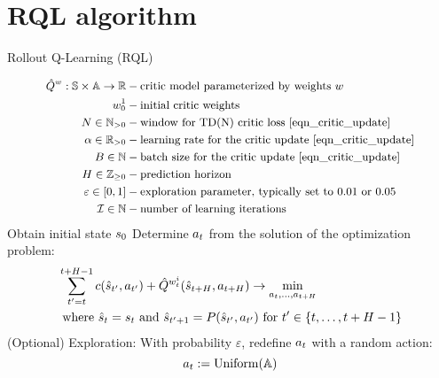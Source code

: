 \documentclass[12pt,twoside]{../../mitthesis}
\begin{document}
\section*{RQL algorithm}
\begin{algorithm}
    \caption{Rollout Q-Learning (RQL)}
    \label{alg:my-alg}
    \begin{algorithmic}[1]
    \begin{equation*}
        \small
        \begin{aligned}
            \hat{Q}^w : \mathbb S \times \mathbb A \to {\mathbb{R}} &- \text{critic model parameterized by weights $w$} \\
            w_0^1 & - \text{initial critic weights} \\
            N \in {\mathbb{N}}_{>0} & - \text{window for TD(N) critic loss \eqref{eqn_critic_update}} \\
            \alpha \in {\mathbb{R}}_{>0}& - \text{learning rate for the critic update \eqref{eqn_critic_update}} \\
            B \in {\mathbb{N}} & - \text{batch size for the critic update \eqref{eqn_critic_update}} \\
            H \in {\mathbb{Z}}_{\geq 0} & - \text{prediction horizon} \\
            \varepsilon \in [0, 1] & - \text{exploration parameter, typically set to 0.01 or 0.05} \\
            \mathcal I \in {\mathbb{N}} & - \text{number of learning iterations}
        \end{aligned}
    \end{equation*}
        \STATE Obtain initial state $s_0$
            \STATE Determine $a_t$ from the solution of the optimization problem:
            $$
                \begin{aligned}
                    &\sum_{t'=t}^{t+H-1} c(\hat{s}_{t'}, a_{t'}) + \hat Q^{w_t^i}(\hat{s}_{t + H}, a_{t + H}) \rightarrow \min_{a_t, \dots, a_{t+H}} \\
                    &\text{ where } \hat{s}_t = s_t \text{ and } \hat{s}_{t' + 1} = P(\hat{s}_{t'}, a_{t'}) \text{ for } t' \in \{t, \ldots, t+H-1\}
                \end{aligned}
            $$
            \STATE (Optional) Exploration: With probability $\varepsilon$, redefine $a_t$ with a random action:
            $$
                a_t := \operatorname{Uniform}(\mathbb A) 
$$
\end{algorithmic}
\end{algorithm}
\end{document}

